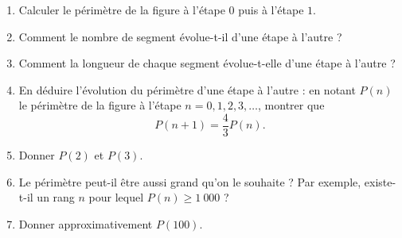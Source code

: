 {	\begin{enumerate}
		\item Calculer le périmètre de la figure à l'étape $0$ puis à l'étape $1$.
		\item Comment le nombre de segment évolue-t-il d'une étape à l'autre ?
		\item Comment la longueur de chaque segment évolue-t-elle d'une étape à l'autre ?
		\item En déduire l'évolution du périmètre d'une étape à l'autre :
		en notant $P(n)$ le périmètre de la figure à l'étape $n=0, 1, 2, 3,\dots$, montrer que
			\[ P(n+1) = \dfrac43 P(n). \]
		\item Donner $P(2)$ et $P(3)$.
		\item Le périmètre peut-il être aussi grand qu'on le souhaite ? Par exemple, existe-t-il un rang $n$ pour lequel $P(n) \geq 1 \ 000$ ?
		\item Donner approximativement $P(100)$.
	\end{enumerate}
}{}


